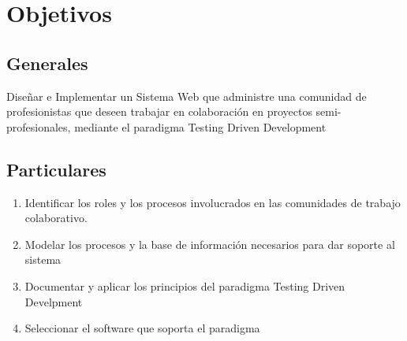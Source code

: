 \chapter{Objetivos}

\section{Generales}
\setlength{\parindent}{10ex}
Diseñar e Implementar un Sistema Web que administre una comunidad de profesionistas que deseen trabajar en colaboración en proyectos semi-profesionales, mediante 
el paradigma  Testing Driven Development

\section{Particulares}
\begin{enumerate}
\item Identificar los roles y los procesos involucrados en las comunidades de trabajo colaborativo.
\item Modelar los procesos y la base de información  necesarios para dar soporte al sistema
\item Documentar y aplicar los principios del paradigma Testing Driven Develpment
\item Seleccionar el software que soporta el paradigma
\end{enumerate}
